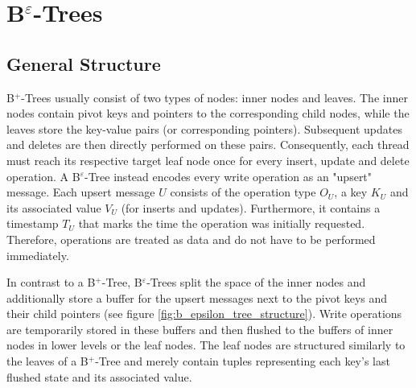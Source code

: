 
\chapter{B$^\varepsilon$-Trees}\label{chapter:be-tree}

\section{General Structure} \label{section:3.1}

B$^+$-Trees usually consist of two types of nodes: inner nodes and leaves. The inner nodes contain pivot keys and pointers to the corresponding child nodes, while the leaves store the key-value pairs (or corresponding pointers). Subsequent updates and deletes are then directly performed on these pairs. Consequently, each thread must reach its respective target leaf node once for every insert, update and delete operation.\newline
A B$^\varepsilon$-Tree instead encodes every write operation as an "upsert" message. Each upsert message $U$ consists of the operation type $O_U$, a key $K_U$ and its associated value $V_U$ (for inserts and updates). Furthermore, it contains a timestamp $T_U$ that marks the time the operation was initially requested. Therefore, operations are treated as data and do not have to be performed immediately. \cite{b_epsilon_tree}

In contrast to a B$^+$-Tree, B$^\varepsilon$-Trees split the space of the inner nodes and additionally store a buffer for the upsert messages next to the pivot keys and their child pointers (see figure \ref{fig:b_epsilon_tree_structure}). Write operations are temporarily stored in these buffers and then flushed to the buffers of inner nodes in lower levels or the leaf nodes. The leaf nodes are structured similarly to the leaves of a B$^+$-Tree and merely contain tuples representing each key's last flushed state and its associated value.

